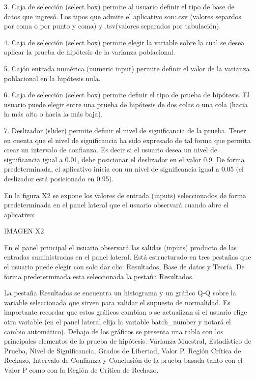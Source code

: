 \documentclass[]{comunicaciones}
\begin{document}
3.	Caja de selección (select box) permite al usuario definir el tipo de base de datos que ingresó. Los tipos que admite el aplicativo son:.csv (valores separdos por coma o por punto y coma) y .tsv(valores separados por tabulación).

4.	Caja de selección (select box) permite elegir la variable sobre la cual se desea aplicar la prueba de hipótesis de la varianza poblacional.

5.	Cajón entrada numérica (numeric input) permite definir el valor de la varianza poblacional en la hipótesis nula.

6.	Caja de selección (select box) permite definir el tipo de prueba de hipótesis. El usuario puede elegir entre una prueba de hipótesis de dos colas o una cola (hacia la más alta o hacia la más baja).

7.	Deslizador (slider) permite definir el nivel de significancia de la prueba. Tener en cuenta que el nivel de significancia ha sido expresado de tal forma que permita crear un intervalo de confianza. Es decir si el usuario desea un nivel de significancia igual a 0.01, debe posicionar el deslizador en el valor 0.9. De forma predeterminada, el aplicativo inicia con un nivel de significancia igual a 0.05 (el deslizador está posicionado en 0.95).

En la figura X2 se expone los valores de entrada (inputs) seleccionados de forma predeterminada en el panel lateral que el usuario observará cuando abre el aplicativo:

IMAGEN X2

En el panel principal el usuario observará las salidas (inputs) producto de las entradas suministradas en el panel lateral. Está estructurado en tres pestañas que el usuario puede elegir con solo dar clic: Resultados, Base de datos y Teoría. De forma predeterminada esta seleccionada la pestaña Resultados.

La pestaña Resultados se encuentra un histograma y un gráfico Q-Q sobre la variable seleccionada que sirven para validar el supuesto de normalidad. Es importante recordar que estos gráficos cambian o se actualizan si el usuario elige otra variable (en el panel lateral elija la variable batch_number y notará el cambio automático). Debajo de los gráficos se presenta una tabla con los principales elementos de la prueba de hipótesis: Varianza Muestral, Estadístico de Prueba, Nivel de Significancia, Grados de Libertad, Valor P, Región Crítica de Rechazo, Intervalo de Confianza y Conclusión de la prueba basada tanto con el Valor P como con la Región de Crítica de Rechazo.
\end{document}
